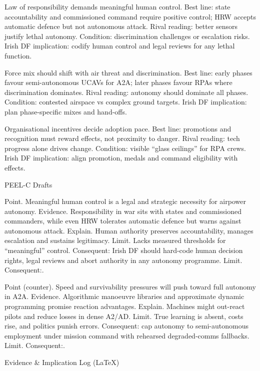 Law of responsibility demands meaningful human control.
Best line: state accountability and commissioned command require positive control; HRW accepts automatic defence but not autonomous attack.
Rival reading: better sensors justify lethal autonomy.
Condition: discrimination challenges or escalation risks.
Irish DF implication: codify human control and legal reviews for any lethal function.

Force mix should shift with air threat and discrimination.
Best line: early phases favour semi-autonomous UCAVs for A2A; later phases favour RPAs where discrimination dominates.
Rival reading: autonomy should dominate all phases.
Condition: contested airspace vs complex ground targets.
Irish DF implication: plan phase-specific mixes and hand-offs.

Organisational incentives decide adoption pace.
Best line: promotions and recognition must reward effects, not proximity to danger.
Rival reading: tech progress alone drives change.
Condition: visible “glass ceilings” for RPA crews.
Irish DF implication: align promotion, medals and command eligibility with effects.

PEEL-C Drafts

Point. Meaningful human control is a legal and strategic necessity for airpower autonomy.
Evidence. Responsibility in war sits with states and commissioned commanders, while even HRW tolerates automatic defence but warns against autonomous attack.
Explain. Human authority preserves accountability, manages escalation and sustains legitimacy.
Limit. Lacks measured thresholds for “meaningful” control. Consequent: Irish DF should hard-code human decision rights, legal reviews and abort authority in any autonomy programme. Limit. Consequent:.

Point (counter). Speed and survivability pressures will push toward full autonomy in A2A.
Evidence. Algorithmic manoeuvre libraries and approximate dynamic programming promise reaction advantages.
Explain. Machines might out-react pilots and reduce losses in dense A2/AD.
Limit. True learning is absent, costs rise, and politics punish errors. Consequent: cap autonomy to semi-autonomous employment under mission command with rehearsed degraded-comms fallbacks. Limit. Consequent:.

Evidence & Implication Log (LaTeX)

